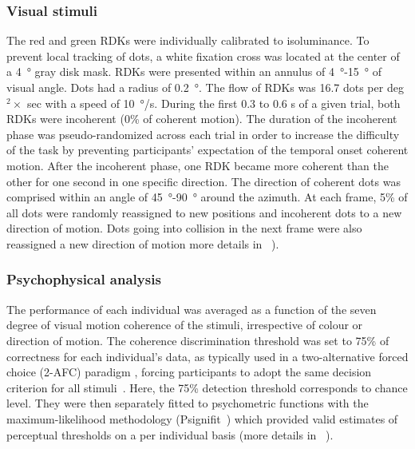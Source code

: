 \subsubsection*{Visual stimuli}
The red and green RDKs were individually calibrated to isoluminance. To prevent local tracking of dots, a white fixation cross was located at the center of a \SI{4}{\degree} gray disk mask. RDKs were presented within an annulus of \SI{4}{\degree}-\SI{15}{\degree} of visual angle. Dots had a radius of \SI{0.2}{\degree}. The flow of RDKs was 16.7 dots per deg$^2 \times$ sec with a speed of \SI{10}{\degree}/s. During the first 0.3 to 0.6 s of a given trial, both RDKs were incoherent (0\% of coherent motion). The duration of the incoherent phase was pseudo-randomized across each trial in order to increase the difficulty of the task by preventing participants’ expectation of the temporal onset coherent motion. After the incoherent phase, one RDK became more coherent than the other for one second in one specific direction. The direction of coherent dots was comprised within an angle of \SI{45}{\degree}-\SI{90}{\degree} around the azimuth. At each frame, 5\% of all dots were randomly reassigned to new positions and incoherent dots to a new direction of motion. Dots going into collision in the next frame were also reassigned a new direction of motion more details in ~\cite{23zilber2014supramodal}).


\subsubsection*{Psychophysical analysis}
The performance of each individual was averaged as a function of the seven degree of visual motion coherence of the stimuli, irrespective of colour or direction of motion. The coherence discrimination threshold was set to 75\% of correctness for each individual’s data, as typically used in a two-alternative forced choice (2-AFC) paradigm
, forcing participants to adopt the same decision criterion for all stimuli~\cite{GreenSwets}. Here, the 75\% detection threshold corresponds to chance level. They were then separately fitted to psychometric functions with the maximum-likelihood methodology (Psignifit~\cite{41wichmann2001psychometric}) which provided valid estimates of perceptual thresholds on a per individual basis (more details in ~\cite{23zilber2014supramodal}).

